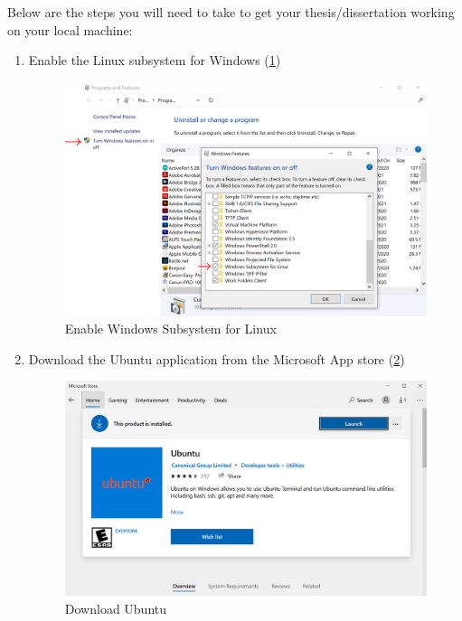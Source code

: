 \documentclass[../Dissertation]{subfiles}
\begin{document}
    Below are the steps you will need to take to get your thesis/dissertation
    working on your local machine:
    \begin{enumerate}
        \item Enable the Linux subsystem for Windows (\cref{fig:LinuxSubsystem})
            \begin{figure}[H]
                \centering
                \includegraphics[width=1.0\textwidth]
                {./LinuxSubsystem}
                \caption{Enable Windows Subsystem for Linux}
                \label{fig:LinuxSubsystem}
            \end{figure}
        \item Download the Ubuntu application from the Microsoft App store
            (\cref{fig:UbuntuApp})
            \begin{figure}[H]
                \centering
                \includegraphics[width=1.0\textwidth]
                {./UbuntuApp}
                \caption{Download Ubuntu}
                \label{fig:UbuntuApp}

\end{figure}
\end{enumerate}
\end{document}

